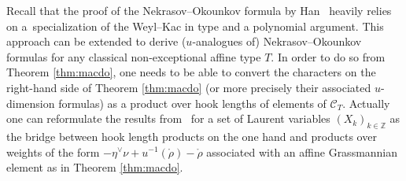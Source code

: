 \documentclass[10pt,a4paper]{amsart}
\numberwithin{equation}{section}
\newcommand{\cC}{\mathcal{C}}
\newcommand{\Z}{\mathbb{Z}}
\begin{document}
Recall that the proof of the Nekrasov--Okounkov formula by Han~\cite{Han08} heavily relies on a~specialization of the Weyl--Kac in type  and a polynomial argument. This approach can be extended to derive ($u$-analogues of) Nekrasov--Okounkov formulas for any classical non-exceptional affine type $T$. In order to do so from Theorem \ref{thm:macdo}, one needs to be able to convert the characters on the right-hand side of Theorem \ref{thm:macdo} (or more precisely their associated $u$-dimension formulas) as a product over hook lengths of elements of $\cC_T$. Actually one can reformulate the results from~\cite[Section $4.2$]{Wmac} for a set of Laurent variables $(X_k)_{k\in \Z}$ as the bridge between hook length products on the one hand and products over weights of the form $-\eta ^{\vee }\nu +u^{-1}(\mathring{\rho})-\mathring{\rho}$ associated with an affine Grassmannian element as in Theorem \ref{thm:macdo}.
\end{document}
